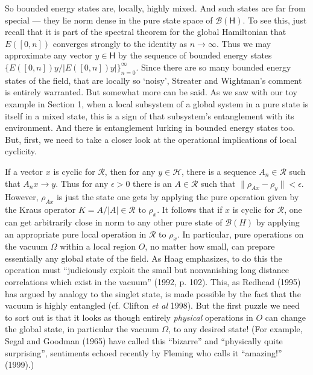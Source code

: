 \documentclass[12pt]{article}
\newcommand{\alg}[1]{\mbox{$\mathcal{#1}$}}
\newcommand{\hil}[1]{\mbox{$\mathsf{#1}$}}
\begin{document}
  So bounded energy states are, locally, highly mixed.  And such 
  states are far from special --- they lie norm dense in the pure 
  state space of  $\alg{B}(\hil{H})$.  To see this, just recall that it is part of the 
  spectral theorem for the global Hamiltonian that 
  $E([0,n])$ converges strongly to the identity as 
  $n\rightarrow\infty$.  Thus we may 
  approximate any vector $y\in\hil{H}$ by the sequence of bounded 
  energy states
  $\{E([0,n])y/|E([0,n])y|\}_{n=0}^{\infty}$.  Since there are so many bounded 
  energy states of the field, that are locally so `noisy',  Streater and 
  Wightman's comment is entirely warranted.
  But somewhat more can be said.  As we saw with our toy 
  example in Section 1, when a local subsystem of a global system in a pure 
  state is itself in a mixed state, this is a sign 
  of that subsystem's entanglement with its environment. And there is 
  entanglement lurking in bounded energy states too.  
  But, first, 
  we need to take a closer look at the operational implications of 
  local cyclicity. 
  
  If a vector $x$ is cyclic for 
  $\alg{R}$, then for any $y\in\alg{H}$, 
  there is a sequence $A_{n}\in\alg{R}$ such that $A_{n}x\rightarrow 
  y$.  Thus for any  
  $\epsilon>0$ there is an $A\in\alg{R}$ such that 
  $\|\rho_{Ax}-\rho_{y}\|<\epsilon$.  However, $\rho_{Ax}$ 
  is just 
  the state one gets by applying the pure 
  operation given by the Kraus operator $K=A/|A|\in\alg{R}$ to $\rho_{x}$.  It follows 
  that if $x$ is cyclic for $\alg{R}$, one can get arbitrarily close 
  in norm to any other pure state of $\alg{B}(H)$ by applying an 
  appropriate pure local operation in $\alg{R}$ to $\rho_{x}$.  In particular, pure 
  operations on the vacuum $\Omega$ within a local region $O$, no matter how small, can prepare 
  essentially any global state 
  of the field.  As Haag emphasizes, to do this the 
  operation must 
  ``judiciously exploit the small but nonvanishing long 
distance correlations which exist in the vacuum'' (1992, p. 102).  
This, as Redhead (1995) has argued by analogy to the 
singlet state, is made possible by the fact 
that the vacuum is highly entangled (cf. Clifton \emph{et 
al} 1998).  But the first puzzle we need 
to sort out is that it looks as though entirely \emph{physical} operations 
in $O$ can change the global state, in particular the vacuum $\Omega$, 
to any desired state!  (For example, Segal and 
Goodman (1965) have called this  
``bizarre'' and ``physically quite 
surprising'', sentiments echoed recently by
Fleming who calls it ``amazing!'' (1999).)
\end{document}
